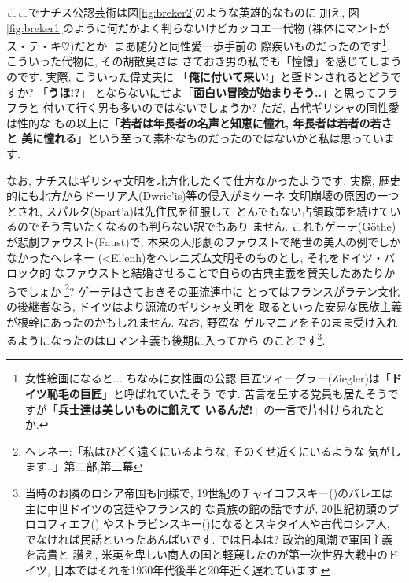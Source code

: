 ここでナチス公認芸術は図\ref{fig:breker2}のような英雄的なものに
加え, 図\ref{fig:breker1}のように何だかよく判らないけどカッコエー代物
(裸体にマントがス・テ・キ$\heartsuit$)だとか, まあ随分と同性愛一歩手前の
際疾いものだったのです\footnote{女性絵画になると... ちなみに女性画の公認
巨匠ツィーグラー(Ziegler)は「\textbf{ドイツ恥毛の巨匠}」と呼ばれていたそう
です. 苦言を呈する党員も居たそうですが「\textbf{兵士達は美しいものに飢えて
いるんだ!}」の一言で片付けられたとか.}. こういった代物に, その胡散臭さは
さておき男の私でも「憧憬」を感じてしまうのです. 実際, こういった偉丈夫に
「\textbf{俺に付いて来い!}」と壁ドンされるとどうですか? 「\textbf{うほ!?}」
とならないにせよ「\textbf{面白い冒険が始まりそう..}」と思ってフラフラと
付いて行く男も多いのではないでしょうか? ただ, 古代ギリシャの同性愛は性的な
もの以上に「\textbf{若者は年長者の名声と知恵に憧れ, 年長者は若者の若さと
美に憧れる}」という至って素朴なものだったのではないかと私は思っています.
\newline

なお, ナチスはギリシャ文明を北方化したくて仕方なかったようです.
 実際, 歴史的にも北方からドーリア人(\textgreek{Dwrie'is})等の侵入がミケーネ
文明崩壊の原因の一つとされ, スパルタ(\textgreek{Spart'a})は先住民を征服して
とんでもない占領政策を続けているのでそう言いたくなるのも判らない訳でもあり
ません. これもゲーテ(G\"othe)が悲劇ファウスト(Faust)\cite{ゲーテ}で,
 本来の人形劇のファウストで絶世の美人の例でしかなかったヘレネー
(\textgreek{<El'enh})をヘレニズム文明そのものとし, それをドイツ・バロック的
なファウストと結婚させることで自らの古典主義を賛美したあたりからでしょか
\footnote{ヘレネー:「私はひどく遠くにいるような, そのくせ近くにいるような
気がします..」\cite{ゲーテ}第二部,第三幕}?  ゲーテはさておきその亜流連中に
とってはフランスがラテン文化の後継者なら, ドイツはより源流のギリシャ文明を
取るといった安易な民族主義が根幹にあったのかもしれません. なお, 野蛮な
ゲルマニアをそのまま受け入れるようになったのはロマン主義も後期に入ってから
のことです\footnote{当時のお隣のロシア帝国も同様で, 19世紀のチャイコフスキー({})のバレエは主に中世ドイツの宮廷やフランス的
な貴族の館の話ですが, 20世紀初頭のプロコフィエフ({})
やストラビンスキー({})になるとスキタイ人や古代ロシア人,
 でなければ民話といったあんばいです. では日本は? 政治的風潮で軍国主義を高貴と
讃え, 米英を卑しい商人の国と軽蔑したのが第一次世界大戦中のドイツ\cite{クラウス},
 日本ではそれを1930年代後半と20年近く遅れています.}.
\newline

